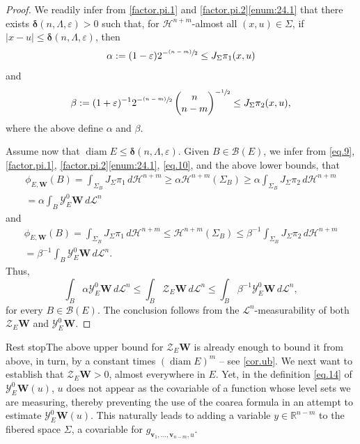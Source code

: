 \documentclass[JEP,XML,SOM,Unicode,ThmDefs,NoEqCountersInSection]{cedram}
\newcommand{\psfrac}[2]{\sfrac{(#1)}{#2}}
\newenvironment{Empty}[2][\null]{%
\begin{enonce}[remark]{#1}#2}
{\end{enonce}}
\newcommand{\R}{\mathbb{R}}
\newcommand{\calB}{\mathscr{B}}
\newcommand{\calH}{\mathscr{H}}
\newcommand{\calL}{\mathscr{L}}
\newcommand{\calY}{\mathscr{Y}}
\newcommand{\calZ}{\mathscr{Z}}
\newcommand{\bdelta}{\boldsymbol{\delta}}
\newcommand{\bW}{{\boldsymbol{W}}}
\newcommand{\bv}{{\boldsymbol{v}}}
\DeclareMathOperator{\rmdiam}{\mathrm{diam}}
\newcommand{\bin}[2]{
\begin{pmatrix} #1 \\
#2
\end{pmatrix}}
\let\veps\varepsilon
\begin{document}
\begin{proof}
We readily infer from \ref{factor.pi.1} and \ref{factor.pi.2}\eqref{enum:24.1} that there exists $\bdelta(n,\Lambda,\veps) > 0$ such that, for $\calH^{n+m}$-almost all $(x,u) \in \Sigma$, if $|x-u| \leq \bdelta(n,\Lambda,\veps)$, then
\begin{equation}
\alpha:= (1-\veps) 2^{-\psfrac{n-m}{2}} \leq J_\Sigma \pi_1(x,u)
\end{equation}
and\vspace*{-5pt}
\begin{equation}
\beta:= (1+\veps)^{-1} 2^{-\psfrac{n-m}{2}} \bin{n}{n-m}^{-\sfrac{1}{2}} \leq J_\Sigma \pi_2(x,u),
\end{equation}
where the above define $\alpha$ and $\beta$.
\par
Assume now that $\rmdiam E \leq \bdelta(n,\Lambda,\veps)$.
Given $B \in \calB(E)$, we infer from \eqref{eq.9}, \ref{factor.pi.1}, \ref{factor.pi.2}\eqref{enum:24.1}, \eqref{eq.10}, and the above lower bounds, that\vspace*{-5pt}
\begin{multline*}
\phi_{E,\bW}(B) = \int_{\Sigma_B} J_\Sigma \pi_1 \,d\calH^{n+m}
\geq \alpha \calH^{n+m}(\Sigma_B)
\geq \alpha \int_{\Sigma_B} J_\Sigma \pi_2 \,d\calH^{n+m} \\[-8pt]
= \alpha \int_B \calY^0_E \bW \,d\calL^n
\end{multline*}
and\vspace*{-5pt}
\begin{multline*}
\phi_{E,\bW}(B) = \int_{\Sigma_B} J_\Sigma \pi_1 \,d\calH^{n+m} \leq \calH^{n+m}(\Sigma_B) \leq \beta^{-1} \int_{\Sigma_B} J_\Sigma \pi_2 \,d\calH^{n+m} \\[-8pt]
= \beta^{-1} \int_B \calY^0_E \bW \,d\calL^n.
\end{multline*}
Thus,\vspace*{-3pt}
\begin{equation*}
\int_B \alpha\calY^0_E \bW \,d\calL^n \leq \int_B \calZ_E \bW \,d\calL^n \leq \int_B \beta^{-1} \calY^0_E \bW \,d\calL^n,
\end{equation*}
for every $B \in \calB(E)$.
The conclusion follows from the $\calL^n$-measurability of both $\calZ_E \bW$ and $\calY^0_E \bW$.
\end{proof}

\begin{Empty}[Rest stop]
The above upper bound for $\calZ_E \bW$ is already enough to bound it from above, in turn, by a constant times $(\rmdiam E)^m$ -- see \ref{cor.ub}.
We next want to establish that $\calZ_E \bW > 0$, almost everywhere in $E$.
Yet, in the definition \eqref{eq.14} of $\calY^0_E \bW(u)$, $u$ does not appear as the covariable of a function whose level sets we are measuring, thereby preventing the use of the coarea formula in an attempt to estimate $\calY^0_E \bW(u)$.
This naturally leads to adding a variable $y \in \R^{n-m}$ to the fibered space $\Sigma$, a covariable for $g_{\bv_1,\ldots,\bv_{n-m},u}$.
\end{Empty}
\end{document}
